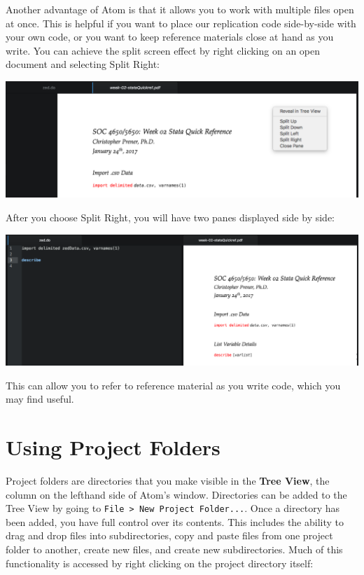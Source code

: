 \documentclass[]{book}
\begin{document}
Another advantage of Atom is that it allows you to work with multiple
files open at once. This is helpful if you want to place our replication
code side-by-side with your own code, or you want to keep reference
materials close at hand as you write. You can achieve the split screen
effect by right clicking on an open document and selecting Split Right:

\includegraphics[width=1\linewidth]{images/atomSplit}

After you choose Split Right, you will have two panes displayed side by
side:

\includegraphics[width=1\linewidth]{images/atomSplit2}

This can allow you to refer to reference material as you write code,
which you may find useful.

\section{Using Project Folders}\label{using-project-folders}

Project folders are directories that you make visible in the
\textbf{Tree View}, the column on the lefthand side of Atom's window.
Directories can be added to the Tree View by going to
\texttt{File\ \textgreater{}\ New\ Project\ Folder...}. Once a directory
has been added, you have full control over its contents. This includes
the ability to drag and drop files into subdirectories, copy and paste
files from one project folder to another, create new files, and create
new subdirectories. Much of this functionality is accessed by right
clicking on the project directory itself:
\end{document}
